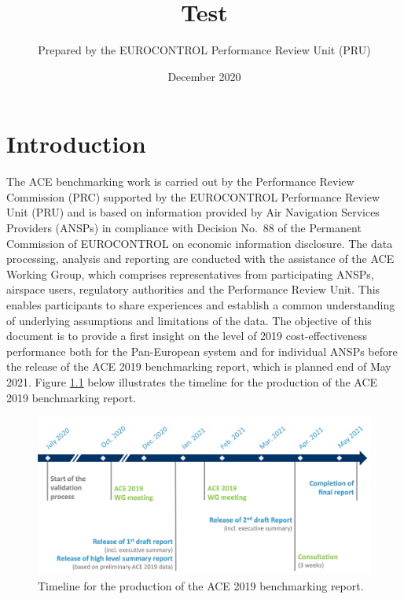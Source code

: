 \documentclass[
]{book}
\title{Test}
\author{Prepared by the EUROCONTROL Performance Review Unit (PRU)}
\date{December 2020}
\begin{document}
\maketitle

{
\setcounter{tocdepth}{1}
\tableofcontents
}
\hypertarget{introduction}{%
\chapter{Introduction}\label{introduction}}

The ACE benchmarking work is carried out by the Performance Review Commission (PRC) supported by the EUROCONTROL Performance Review Unit (PRU) and is based on information provided by Air Navigation Services Providers (ANSPs) in compliance with Decision No.~88 of the Permanent Commission of EUROCONTROL on economic information disclosure.
The data processing, analysis and reporting are conducted with the assistance of the ACE Working Group, which comprises representatives from participating ANSPs, airspace users, regulatory authorities and the Performance Review Unit. This enables participants to share experiences and establish a common understanding of underlying assumptions and limitations of the data.
The objective of this document is to provide a first insight on the level of 2019 cost-effectiveness performance both for the Pan-European system and for individual ANSPs before the release of the ACE 2019 benchmarking report, which is planned end of May 2021. Figure \ref{fig:figure1} below illustrates the timeline for the production of the ACE 2019 benchmarking report.



\begin{figure}

{\centering \includegraphics[width=1\linewidth]{figures/Figure 1-1} 

}

\caption{Timeline for the production of the ACE 2019 benchmarking report.}\label{fig:figure1}
\end{figure}
\end{document}
